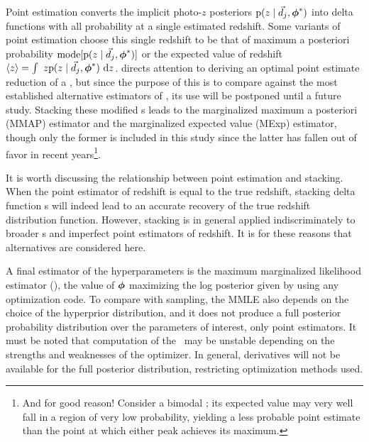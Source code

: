 Point estimation converts the implicit photo-$z$ posteriors $\mathrm{p}(z \mid \vec{d}_{j}, {\boldsymbol{\phi}}^{*})$ into delta functions with all probability at a single estimated redshift.  
Some variants of point estimation choose this single redshift to be that of maximum a posteriori probability $\mathrm{mode}[\mathrm{p}(z \mid \vec{d}_{j}, {\boldsymbol{\phi}}^{*})]$ or the expected value of redshift $\langle z \rangle = \int\ z \mathrm{p}(z \mid \vec{d}_{j}, {\boldsymbol{\phi}}^{*})\ \mathrm{d} z$.
\cite{tanaka_photometric_2018} directs attention to deriving an optimal point estimate reduction of a \pzpdf, but since the purpose of this \paper is to compare against the most established alternative estimators of \nz, its use will be postponed until a future study.
Stacking these modified \pzpdf s leads to the marginalized maximum a posteriori (MMAP) estimator and the marginalized expected value (MExp) estimator, though only the former is included in this study since the latter has fallen out of favor in recent years\footnote{And for good reason!  Consider a bimodal \pzpdf; its expected value may very well fall in a region of very low probability, yielding a less probable point estimate than the point at which either peak achieves its maximum.}.

It is worth discussing the relationship between point estimation and stacking.  
When the point estimator of redshift is equal to the true redshift, stacking delta function \pzpdf s will indeed lead to an accurate recovery of the true redshift distribution function.  
However, stacking is in general applied indiscriminately to broader \pzpdf s and imperfect point estimators of redshift.  
It is for these reasons that alternatives are considered here.

A final estimator of the hyperparameters is the maximum marginalized likelihood estimator (\mmle), the value of ${\boldsymbol{\phi}}$ maximizing the log posterior given by  using any optimization code.  
To compare with sampling, the MMLE also depends on the choice of the hyperprior distribution, and it does not produce a full posterior probability distribution over the parameters of interest, only point estimators.  
It must be noted that computation of the \mmle\ may be unstable depending on the strengths and weaknesses of the optimizer.  
In general, derivatives will not be available for the full posterior distribution, restricting optimization methods used.

